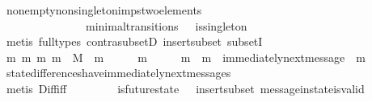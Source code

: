 \begin{isabellebody}
\ non{\isacharunderscore}empty{\isacharunderscore}non{\isacharunderscore}singleton{\isacharunderscore}imps{\isacharunderscore}two{\isacharunderscore}elements\ \isanewline
\ \ \ \ \ \ \ \ \ \ \ \ {\isacartoucheopen}{\isacharparenleft}{\isasymsigma}{\isacharcomma}\ {\isasymsigma}{\isacharprime}{\isacharparenright}\ {\isasymin}\ minimal{\isacharunderscore}transitions\ {\isasymand}\ {\isasymnot}\ is{\isacharunderscore}singleton\ {\isacharparenleft}{\isasymsigma}{\isacharprime}\ {\isacharminus}\ {\isasymsigma}{\isacharparenright}{\isacartoucheclose}\ \ {\isacartoucheopen}{\isasymsigma}{\isacharprime}\ {\isacharminus}\ {\isasymsigma}\ {\isasymnoteq}\ {\isasymemptyset}{\isacartoucheclose}\isanewline
\ \ \ \ \ \ \isamarkupfalse%
\ {\isacharparenleft}metis\ {\isacharparenleft}full{\isacharunderscore}types{\isacharparenright}\ contra{\isacharunderscore}subsetD\ insert{\isacharunderscore}subset\ subsetI{\isacharparenright}\isanewline
\ \ \ \ \isamarkupfalse%
\ \isamarkupfalse%
\ {\isachardoublequoteopen}{\isasymexists}m{}\ m{}{\isachardot}\ {\isacharbraceleft}m{}{\isacharcomma}\ m{}{\isacharbraceright}\ {\isasymsubseteq}\ M\ {\isasymand}\ m{}\ {\isasymin}\ {\isasymsigma}{\isacharprime}\ {\isacharminus}\ {\isasymsigma}\ {\isasymand}\ m{}\ {\isasymin}\ {\isasymsigma}{\isacharprime}\ {\isacharminus}\ {\isasymsigma}\ {\isasymand}\ m{}\ {\isasymnoteq}\ m{}\ {\isasymand}\ immediately{\isacharunderscore}next{\isacharunderscore}message\ {\isacharparenleft}{\isasymsigma}{\isacharcomma}\ m{}{\isacharparenright}{\isachardoublequoteclose}\isanewline
\ \ \ \ \ \ \isamarkupfalse%
\ state{\isacharunderscore}differences{\isacharunderscore}have{\isacharunderscore}immediately{\isacharunderscore}next{\isacharunderscore}messages\isanewline
\ \ \ \ \ \ \isamarkupfalse%
\ {\isacharparenleft}metis\ Diff{\isacharunderscore}iff\ {\isacartoucheopen}{\isasymsigma}{\isacharprime}\ {\isasymin}\ {\isasymSigma}\ {\isasymand}\ {\isasymsigma}\ {\isasymin}\ {\isasymSigma}\ {\isasymand}\ is{\isacharunderscore}future{\isacharunderscore}state\ {\isacharparenleft}{\isasymsigma}{\isacharcomma}\ {\isasymsigma}{\isacharprime}{\isacharparenright}{\isacartoucheclose}\ insert{\isacharunderscore}subset\ message{\isacharunderscore}in{\isacharunderscore}state{\isacharunderscore}is{\isacharunderscore}valid{\isacharparenright}\isanewline
\ \ \isamarkupfalse%
\ \ \ \ \ \ \isanewline
\ \ \isamarkupfalse%

\end{isabellebody}
